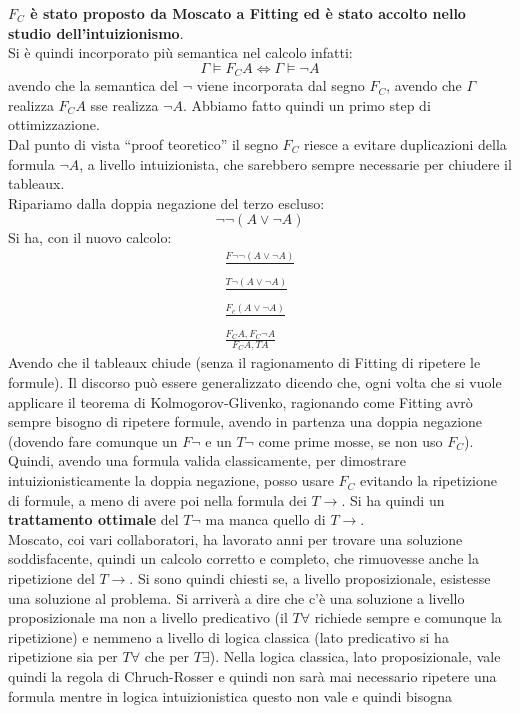\documentclass[a4paper,12pt, oneside]{book}
\begin{document}
\textbf{$F_C$ è stato proposto da Moscato a Fitting ed è stato accolto nello
  studio dell'intuizionismo}.\\
Si è quindi incorporato più semantica nel calcolo infatti:
\[\Gamma\vDash F_CA \iff \Gamma\vDash \neg A\]
avendo che la semantica del $\neg$ viene incorporata dal segno $F_C$, avendo che
$\Gamma$ realizza $F_C A$ sse realizza $\neg A$. Abbiamo fatto quindi un primo
step di ottimizzazione.\\
Dal punto di vista ``proof teoretico'' il segno $F_C$ riesce a evitare
duplicazioni della formula $\neg A$, a livello intuizionista, che sarebbero
sempre necessarie per chiudere il tableaux.\\
Ripariamo dalla doppia negazione del terzo escluso:
\[\neg\neg(A\lor \neg A)\]
Si ha, con il nuovo calcolo:
\begin{gather*}
  \frac{F\neg\neg(A\lor \neg A)}{}\\
  \frac{T\neg (A\lor \neg A)}{}\\
  \frac{F_c(A\lor\neg A)}{}\\
  \frac{F_C A, F_C\neg A}{F_C A, TA}
\end{gather*}
Avendo che il tableaux chiude (senza il ragionamento di Fitting di ripetere le
formule).
Il discorso può essere generalizzato dicendo che, ogni volta che si vuole
applicare il teorema di Kolmogorov-Glivenko, ragionando come Fitting avrò sempre
bisogno di ripetere formule, avendo in partenza una doppia negazione (dovendo
fare comunque un $F\neg$ e un $T\neg$ come prime mosse, se non uso
$F_C$). Quindi, avendo una formula valida classicamente, per dimostrare
intuizionisticamente la doppia negazione, posso usare $F_C$ evitando la
ripetizione di formule, a meno di avere poi nella formula dei $T\to$. Si ha
quindi un \textbf{trattamento ottimale} del $T\neg$ ma manca quello di
$T\to$. \\
Moscato, coi vari collaboratori, ha lavorato anni per trovare una
soluzione soddisfacente, quindi un calcolo corretto e completo, che rimuovesse
anche la ripetizione del $T\to$. Si sono quindi chiesti se, a livello
proposizionale, esistesse una soluzione al problema. Si arriverà a dire che c'è
una soluzione a livello proposizionale ma non a livello predicativo (il
$T\forall$ richiede sempre e comunque la ripetizione) e
nemmeno a livello di logica classica (lato predicativo si ha ripetizione sia per
$T\forall$ che per $T\exists$). Nella logica classica, lato proposizionale, vale
quindi la regola di Chruch-Rosser e quindi non sarà mai necessario ripetere una
formula mentre in logica intuizionistica questo non vale e quindi bisogna
\end{document}
